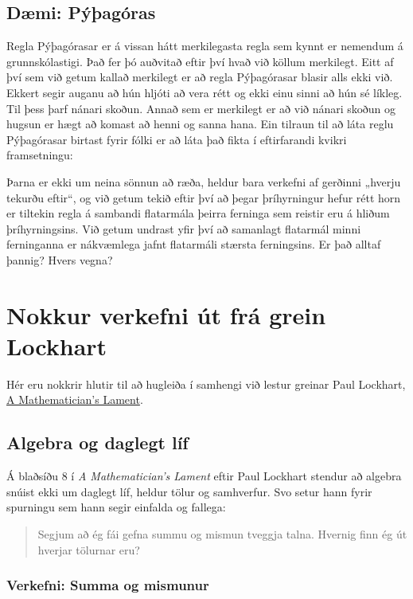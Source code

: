 \documentclass[
  icelandic,
]{book}
\begin{document}
\section{Dæmi: Pýþagóras}\label{pythagoras}

Regla Pýþagórasar er á vissan hátt merkilegasta regla sem kynnt er nemendum á grunnskólastigi. Það fer þó auðvitað eftir því hvað við köllum merkilegt. Eitt af því sem við getum kallað merkilegt er að regla Pýþagórasar blasir alls ekki við. Ekkert segir auganu að hún hljóti að vera rétt og ekki einu sinni að hún sé líkleg. Til þess þarf nánari skoðun. Annað sem er merkilegt er að við nánari skoðun og hugsun er hægt að komast að henni og sanna hana. Ein tilraun til að láta reglu Pýþagórasar birtast fyrir fólki er að láta það fikta í eftirfarandi kvikri framsetningu:

Þarna er ekki um neina sönnun að ræða, heldur bara verkefni af gerðinni „hverju tekurðu eftir``, og við getum tekið eftir því að þegar þríhyrningur hefur rétt horn er tiltekin regla á sambandi flatarmála þeirra ferninga sem reistir eru á hliðum þríhyrningsins. Við getum undrast yfir því að samanlagt flatarmál minni ferninganna er nákvæmlega jafnt flatarmáli stærsta ferningsins. Er það alltaf þannig? Hvers vegna?

\chapter{Nokkur verkefni út frá grein Lockhart}\label{algebra-samhverfa}

Hér eru nokkrir hlutir til að hugleiða í samhengi við lestur greinar Paul Lockhart, \href{https://archive.org/details/AMathematiciansLament}{A Mathematician's Lament}.

\section{Algebra og daglegt líf}\label{algebra-og-daglegt-luxedf}

Á blaðsíðu 8 í \emph{A Mathematician's Lament} eftir Paul Lockhart stendur að algebra snúist ekki um daglegt líf, heldur tölur og samhverfur. Svo setur hann fyrir spurningu sem hann segir einfalda og fallega:

\begin{quote}
Segjum að ég fái gefna summu og mismun tveggja talna. Hvernig finn ég út hverjar tölurnar eru?
\end{quote}

\subsection{Verkefni: Summa og mismunur}\label{verkefni-summa-mismunur}
\end{document}
